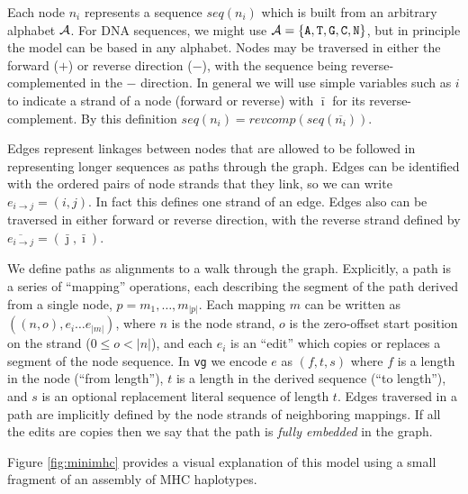 \documentclass{article}
\begin{document}
Each node $n_i$ represents a sequence $seq(n_i)$ which is built from an arbitrary alphabet ${ \cal A }$.
For DNA sequences, we might use ${ \cal A } = \{ {\tt A, T, G, C, N} \}$, but in principle the model can be based in any alphabet.
Nodes may be traversed in either the forward ($+$) or reverse direction ($-$), with the sequence being reverse-complemented in the
$-$ direction.  In general we will use simple variables such as $i$ to indicate a strand of a node (forward or reverse) with $\bar \imath$
for its reverse-complement. By this definition $seq(n_i) = revcomp(seq(\overline{n_i}))$.

Edges represent linkages between nodes that are allowed to be followed in representing longer sequences as paths through the graph.
Edges can be identified with the ordered pairs of node strands that they link, so we can write
$e_{i \rightarrow j} = ( i, j ) $.  In fact this defines one strand of an edge.  Edges also can be traversed in either forward or
reverse direction, with the reverse strand defined by $\overline{e_{i \rightarrow j}} = (  {\bar \jmath}, {\bar \imath} )$.

We define paths as alignments to a walk through the graph.  Explicitly, a path is a series of ``mapping'' operations, each
describing the segment of the path derived from a single node, $p = m_1, \ldots, m_{|p|}$.  Each mapping $m$ can be written
as $( (n, o), e_i \ldots e_{|m|} )$, where $n$ is the node strand, $o$ is the zero-offset start position on the strand ($0 \le o < |n|$),
and each $e_i$ is an ``edit'' which copies or replaces a segment of the node sequence.  In {\tt vg} we encode $e$ as $(f, t, s)$
where $f$ is a length in the node (``from length''), $t$ is a length in the derived sequence (``to length''), and $s$ is an optional
replacement literal sequence of length $t$.  Edges traversed in a path are implicitly defined by the node strands of neighboring mappings.
If all the edits are copies then we say that the path is {\em fully embedded} in the graph.

Figure \ref{fig:minimhc} provides a visual explanation of this model using a small fragment of an assembly of MHC haplotypes.
\end{document}
